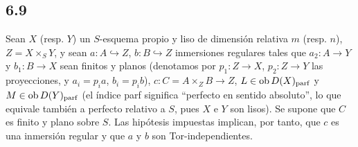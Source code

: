 \subsection*{6.9}

Sean $X$ (resp. $Y$) un $S$-esquema propio y liso de dimensión relativa $m$ (resp. $n$), $Z=X\times_S Y$, y sean $a:A\hookrightarrow Z$, $b:B\hookrightarrow Z$ inmersiones regulares tales que $a_2:A\to Y$ y $b_1:B\to X$ sean finitos y planos (denotamos por $p_1:Z\to X$, $p_2:Z\to Y$ las proyecciones, y $a_i=p_i a$, $b_i=p_i b$), $c:C=A\times_Z B\to Z$, $L\in\operatorname{ob} D(X)_{\mathrm{parf}}$ y $M\in\operatorname{ob} D(Y)_{\mathrm{parf}}$ (el índice parf significa ``perfecto en sentido absoluto'', lo que equivale también a perfecto relativo a $S$, pues $X$ e $Y$ son lisos). Se supone que $C$ es finito y plano sobre $S$. Las hipótesis impuestas implican, por tanto, que $c$ es una inmersión regular y que $a$ y $b$ son Tor-independientes.


